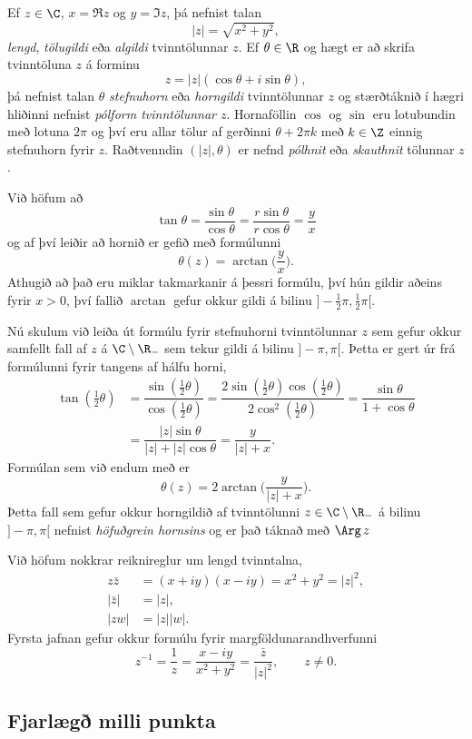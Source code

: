 Ef $z\in \C$, $x=\Re z$ og $y=\Im z$, þá nefnist talan
$$
|z|=\sqrt{x^ 2+y^2},
$$
{\it lengd}, {\it tölugildi } eða {\it algildi } tvinntölunnar
$z$.  
Ef $\theta\in \R$ og hægt er að skrifa tvinntöluna $z$ 
á forminu $$
z=|z|(\cos \theta +i\sin \theta),
$$
þá nefnist talan $\theta$ {\it stefnuhorn} eða 
{\it horngildi } tvinntölunnar $z$ og stærðtáknið í hægri hliðinni
nefnist {\it pólform tvinntölunnar $z$}.
Hornaföllin $\cos$ og $\sin$ eru lotubundin með lotuna 
$2\pi$ og því eru allar tölur af gerðinni $\theta+2\pi k$
með $k\in \Z$ einnig stefnuhorn fyrir $z$.  
Raðtvenndin $(|z|,\theta)$ er nefnd {\it pólhnit}
eða {\it skauthnit} tölunnar $z$.

Við höfum að $$
\tan \theta=\dfrac{\sin\theta}{\cos\theta}
=\dfrac{r\sin\theta}{r\cos\theta}=\dfrac yx
$$
og af því leiðir að hornið er gefið með formúlunni
$$
\theta(z)=\arctan\bigg(\dfrac yx\bigg).
$$
Athugið að það eru miklar takmarkanir á þessri formúlu, því hún gildir
aðeins fyrir $x>0$, því fallið $\arctan$ gefur okkur gildi á bilinu
$]-\tfrac 12 \pi,\tfrac 12 \pi[$.  

Nú skulum við leiða út formúlu fyrir stefnuhorni tvinntölunnar 
$z$ sem gefur okkur samfellt fall af $z$ á $\C\setminus \R_-$ sem
tekur gildi á bilinu $]-\pi,\pi[$. Þetta er gert úr frá formúlunni
fyrir tangens af hálfu horni,
\begin{align*}
\tan(\tfrac 12\theta)&=\dfrac{\sin(\tfrac 12\theta)}{\cos(\tfrac
12\theta)} = \dfrac{2\sin(\tfrac 12\theta)\cos(\tfrac 12\theta)}
{2\cos^2(\tfrac 12\theta)}=\dfrac{\sin \theta}{1+\cos\theta}  \\
&=\dfrac{|z|\sin \theta}{|z|+|z|\cos\theta}=\dfrac y{|z|+x}.
\end{align*}
Formúlan sem við endum með er
$$
\theta(z)=2\arctan\bigg(\dfrac y{|z|+x}\bigg).
$$
Þetta fall sem gefur okkur horngildið af tvinntölunni
$z\in \C\setminus \R_-$  á bilinu $]-\pi,\pi[$
nefnist {\it höfuðgrein hornsins} og er það táknað með
$\Arg \, z$

Við höfum nokkrar reiknireglur um lengd tvinntalna,
\begin{align*}
  z\bar z&=(x+iy)(x-iy)=x^2+y^2=|z|^2,\\
|\bar z|&=|z|,\\
|zw|&=|z||w|.
\end{align*}
Fyrsta jafnan  gefur okkur 
formúlu fyrir margföldunarandhverfunni
$$
z^{-1}=\dfrac 1z=\dfrac{x-iy}{x^2+y^2}=\dfrac{\bar z}{|z|^2}, \qquad z\neq 0.
$$

\subsection*{Fjarlægð milli punkta}

